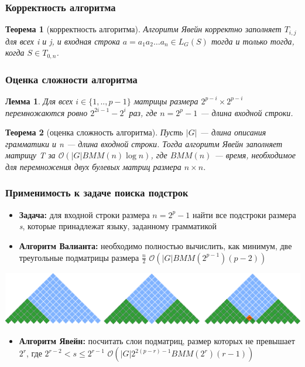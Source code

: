 \documentclass{beamer}
\newtheorem{rutheorem}{Теорема}
\newtheorem{rulemma}{Лемма}
\begin{document}
\begin{frame}
  \transwipe[direction=90]
  \frametitle{Корректность алгоритма}
  \begin{rutheorem}[корректность алгоритма]
    Алгоритм Явейн корректно заполняет $T_{i, j}$ для всех i и j, и входная строка $a = a_{1}a_{2} \dots a_{n} \in L_{G}(S)$ тогда и только тогда, когда $S \in T_{0, n}$.

  \end{rutheorem}
\end{frame}

\begin{frame}
  \transwipe[direction=90]
  \frametitle{Оценка сложности алгоритма}
    \begin{rulemma}
     Для всех $ i \in \{ 1, .., p - 1\}$ матрицы размера $2^{p - i} \times 2^{p - i}$ перемножаются ровно $2^{2i - 1} - 2^{i}$ раз, где $n = 2^p - 1$ --- длина входной строки.
  \end{rulemma}
  
  \begin{rutheorem}[оценка сложность алгоритма]
    Пусть $|G|$ --- длина описания грамматики и \textit{n} --- длина входной строки. Тогда алгоритм Явейн заполняет матрицу \textit{T} за $\mathcal{O}(|G|BMM(n)\log{}n)$, где $BMM(n)$ --- время, необходимое для перемножения двух булевых матриц размера $n \times n$.
  \end{rutheorem}
  
\end{frame}

\begin{frame}
  \transwipe[direction=90]
  \frametitle{Применимость к задаче поиска подстрок}
  \begin{itemize}
      \item \textbf{Задача:} для входной строки размера $n = 2^p - 1$ найти все подстроки размера \textit{s}, которые принадлежат языку, заданному грамматикой
      \item \textbf{Алгоритм Валианта:} необходимо полностью вычислить, как минимум, две треугольные подматрицы размера $\frac{n}{2}$ $\mathcal{O}(|G|BMM(2^{p - 1})(p - 2))$
  \end{itemize}
  
  \begin{center}
  \includegraphics[width=.90\textwidth]{pictures/valsubstring.pdf}    
  \end{center}
  
  \begin{itemize}
      \item  \textbf{Алгоритм Явейн:} посчитать слои подматриц, размер которых не превышает $2^r$, где $2^{r-2} < s \le 2^{r - 1}$ \linebreak $\mathcal{O}(|G|2^{2(p - r) - 1}BMM(2^{r})(r - 1))$
  \end{itemize}
  
\end{frame}
\end{document}
